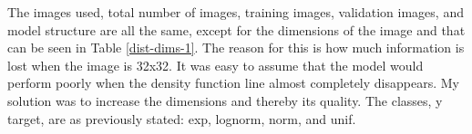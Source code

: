 \documentclass[12pt]{article}
\begin{document}
            \begin{table}[htp]

                \begin{center} 


                \caption{Model Information for all distribution graph classifiers}
                \label{dist-dims-1}

                \end{center}

            \end{table}

            The images used, total number of images, training images, validation images, 
            and model structure are all the same, except for the dimensions of the image and that can be seen in Table \ref{dist-dims-1}.
            The reason for this is how much information is lost when the image is 32x32. 
            It was easy to assume that the model would perform poorly when the density function line almost completely disappears. 
            My solution was to increase the dimensions and thereby its quality. 
            The classes, y target, are as previously stated: exp, lognorm, norm, and unif.
        
\end{document}
